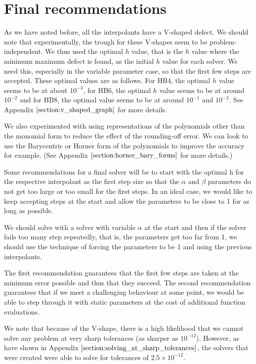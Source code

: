 





\section{Final recommendations}
\label{section:defect_final_recommendations}
As we have noted before, all the interpolants have a V-shaped defect. We should note that experimentally, the trough for these V-shapes seem to be problem-independent. We thus used the optimal $h$ value, that is the $h$ value where the minimum maximum defect is found, as the initial $h$ value for each solver. We need this, especially in the variable parameter case, so that the first few steps are accepted. These optimal values are as follows. For HB4, the optimal $h$ value seems to be at about $10^{-3}$, for HB6, the optimal $h$ value seems to be at around $10^{-2}$ and for HB8, the optimal value seems to be at around $10^{-1}$ and $10^{-2}$. See Appendix $\ref{section:v_shaped_graph}$ for more details.

We also experimented with using representations of the polynomials other than the monomial form to reduce the effect of the rounding-off error. We can look to use the Barycentric or Horner form of the polynomials to improve the accuracy for example. (See Appendix $\ref{section:horner_bary_forms}$ for more details.)

Some recommendations for a final solver will be to start with the optimal h for the respective interpolant as the first step size so that the $\alpha$ and $\beta$ parameters do not get too large or too small for the first steps. In an ideal case, we would like to keep accepting steps at the start and allow the parameters to be close to 1 for as long as possible.

We should solve with a solver with variable $\alpha$ at the start and then if the solver fails too many step repeatedly, that is, the parameters get too far from 1, we should use the technique of forcing the parameters to be 1 and using the previous interpolants.

The first recommendation guarantees that the first few steps are taken at the minimum error possible and thus that they succeed. The second recommendation guarantees that if we meet a challenging behaviour at some point, we would be able to step through it with static parameters at the cost of additional function evaluations.

We note that because of the V-shape, there is a high likelihood that we cannot solve any problem at very sharp tolerances (as sharper as $10^{-12}$). However, as have shown in Appendix $\ref{section:solving_at_sharp_tolerances}$, the solvers that were created were able to solve for tolerances of $2.5 \times 10^{-12}$.
